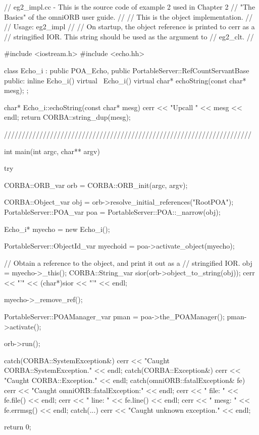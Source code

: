 \documentclass[11pt,twoside,a4paper]{book}
\begin{document}
\begin{cxxlisting}
// eg2_impl.cc - This is the source code of example 2 used in Chapter 2
//               "The Basics" of the omniORB user guide.
//
//               This is the object implementation.
//
// Usage: eg2_impl
//
//        On startup, the object reference is printed to cerr as a
//        stringified IOR. This string should be used as the argument to 
//        eg2_clt.
//

#include <iostream.h>
#include <echo.hh>


class Echo_i : public POA_Echo,
	       public PortableServer::RefCountServantBase
{
public:
  inline Echo_i() {}
  virtual ~Echo_i() {}
  virtual char* echoString(const char* mesg);
};


char* Echo_i::echoString(const char* mesg)
{
  cerr << "Upcall " << mesg << endl;
  return CORBA::string_dup(mesg);
}

//////////////////////////////////////////////////////////////////////

int main(int argc, char** argv)
{
  try {
    CORBA::ORB_var orb = CORBA::ORB_init(argc, argv);

    CORBA::Object_var obj = orb->resolve_initial_references("RootPOA");
    PortableServer::POA_var poa = PortableServer::POA::_narrow(obj);

    Echo_i* myecho = new Echo_i();
      
    PortableServer::ObjectId_var myechoid = poa->activate_object(myecho);

    // Obtain a reference to the object, and print it out as a
    // stringified IOR.
    obj = myecho->_this();
    CORBA::String_var sior(orb->object_to_string(obj));
    cerr << "'" << (char*)sior << "'" << endl;

    myecho->_remove_ref();

    PortableServer::POAManager_var pman = poa->the_POAManager();
    pman->activate();

    orb->run();
  }
  catch(CORBA::SystemException&) {
    cerr << "Caught CORBA::SystemException." << endl;
  }
  catch(CORBA::Exception&) {
    cerr << "Caught CORBA::Exception." << endl;
  }
  catch(omniORB::fatalException& fe) {
    cerr << "Caught omniORB::fatalException:" << endl;
    cerr << "  file: " << fe.file() << endl;
    cerr << "  line: " << fe.line() << endl;
    cerr << "  mesg: " << fe.errmsg() << endl;
  }
  catch(...) {
    cerr << "Caught unknown exception." << endl;
  }

  return 0;
}
\end{cxxlisting}
\end{document}
